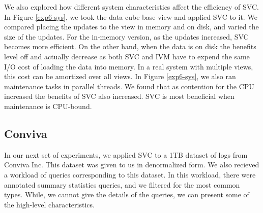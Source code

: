 We also explored how different system characteristics affect the efficiency of SVC.
In Figure \ref{exp6-sys}, we took the data cube base view and applied SVC to it.
We compared placing the updates to the view in memory and on disk, and varied the size of the updates.
For the in-memory version, as the updates increased, SVC becomes more efficient.
On the other hand, when the data is on disk the benefits level off and actually decrease as both SVC and IVM have to 
expend the same I/O cost of loading the data into memory.
In a real system with multiple views, this cost can be amortized over all views.
In Figure \ref{exp6-sys}, we also ran maintenance tasks in parallel threads.
We found that as contention for the CPU increased the benefits of SVC also increased.
SVC is most beneficial when maintenance is CPU-bound.

\subsection{Conviva}
In our next set of experiments, we applied SVC to a 1TB dataset of logs from Conviva Inc.
This dataset was given to us in denormalized form.
We also recieved a workload of queries corresponding to this dataset.
In this workload, there were annotated summary statistics queries, and we filtered for the most common types.
While, we cannot give the details of the queries, we can present some of the high-level characteristics. 

